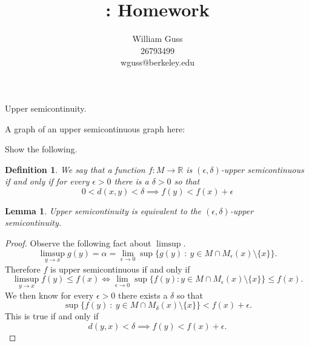 \documentclass[letter]{article}
\title{\bCLASS: Homework \bHWN}
\author{William Guss\\26793499\\wguss@berkeley.edu}
\newtheorem{lemma}{Lemma}
\newtheorem{definition}{Definition}
\newenvironment{menumerate}{%
  \edef\backupindent{\the\parindent}%
  \enumerate%
  \setlength{\parindent}{\backupindent}%
}{\endenumerate}
\begin{document}
\maketitle
\thispagestyle{empty}

\begin{menumerate}
    \setcounter{enumi}{28}
    \item Upper semicontinuity.
    \begin{menumerate}
    \item A graph of an upper semicontinuous graph here:
    \\[3cm]
    \item Show the following.
    \begin{definition}
        We say that a function $f: M \to \mathbb{R}$ is
        $(\epsilon , \delta)$-upper semicontinuous if and only if
        for every $\epsilon > 0$ there is a $\delta > 0$ so that
        \begin{equation}
            0< d(x,y) < \delta \implies f(y) < f(x) + \epsilon
        \end{equation}
    \end{definition}
    \begin{lemma}
        Upper semicontinuity is equivalent to the $(\epsilon, \delta)$-upper semicontinuity.
    \end{lemma}
    \begin{proof}
        Observe the following fact about $\limsup.$ 
        \begin{equation}
            \limsup_{y\to x} g(y) = \alpha = \lim_{\epsilon \to 0} \sup \{g(y)\ :\ y \in M \cap M_{\epsilon}(x) \setminus \{x\}\}.
        \end{equation}
        Therefore $f$ is upper semicontinuous if and only if 
        \begin{equation}
            \limsup_{y\to x} f(y) \leq f(x) \iff \lim_{\epsilon \to 0}
            \sup\{f(y) : y \in M \cap M_{\epsilon}(x) \setminus \{x\} \} \leq f(x).       
        \end{equation}
        We then know for every $\epsilon >0$ there exists a $\delta $
        so that 
        \begin{equation}
            \sup \{f(y) \ :\ y \in M \cap M_\delta (x) \setminus \{x\} \} < f(x) + \epsilon.
        \end{equation}
        This is true if and only if 
        \begin{equation}
            d(y,x) < \delta \implies f(y) < f(x) + \epsilon.       
        \end{equation}

\end{proof}
\end{menumerate}
\end{menumerate}
\end{document}
